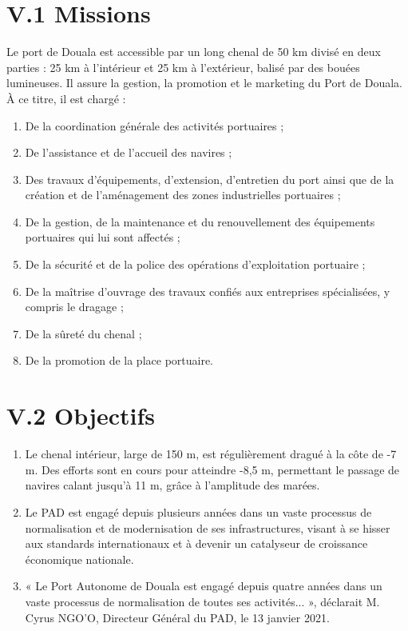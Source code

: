 \documentclass[a4paper,12pt,openany]{report}
\begin{document}
	\section*{V.1 Missions}
	
	Le port de Douala est accessible par un long chenal de 50 km divisé en deux parties : 25 km à l’intérieur et 25 km à l’extérieur, balisé par des bouées lumineuses. Il assure la gestion, la promotion et le marketing du Port de Douala. À ce titre, il est chargé :
	
	\begin{enumerate}
		\item De la coordination générale des activités portuaires ;
		\item De l’assistance et de l’accueil des navires ;
		\item Des travaux d’équipements, d’extension, d’entretien du port ainsi que de la création et de l’aménagement des zones industrielles portuaires ;
		\item De la gestion, de la maintenance et du renouvellement des équipements portuaires qui lui sont affectés ;
		\item De la sécurité et de la police des opérations d’exploitation portuaire ;
		\item De la maîtrise d’ouvrage des travaux confiés aux entreprises spécialisées, y compris le dragage ;
		\item De la sûreté du chenal ;
		\item De la promotion de la place portuaire.
	\end{enumerate}
	
	\section*{V.2 Objectifs}
	
	\begin{enumerate}
		\item Le chenal intérieur, large de 150 m, est régulièrement dragué à la côte de -7 m. Des efforts sont en cours pour atteindre -8,5 m, permettant le passage de navires calant jusqu’à 11 m, grâce à l’amplitude des marées.
		
		\item Le PAD est engagé depuis plusieurs années dans un vaste processus de normalisation et de modernisation de ses infrastructures, visant à se hisser aux standards internationaux et à devenir un catalyseur de croissance économique nationale.
		
		\item « Le Port Autonome de Douala est engagé depuis quatre années dans un vaste processus de normalisation de toutes ses activités... », déclarait M. Cyrus NGO’O, Directeur Général du PAD, le 13 janvier 2021.
	\end{enumerate}
	
\end{document}
